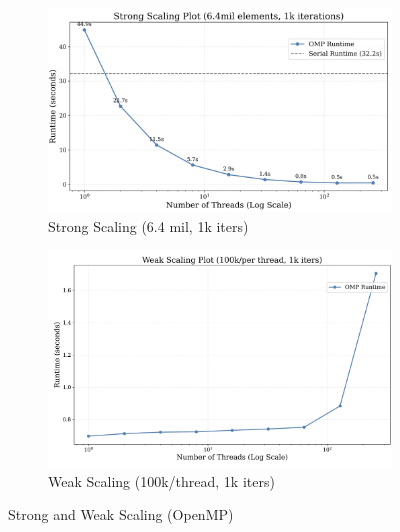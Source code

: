 \documentclass[a4paper,10pt]{article}
\begin{document}
\begin{figure}
     \centering
     \begin{subfigure}[b]{0.45\textwidth}
         \centering
         \includegraphics[width=\textwidth]{../images/2_openmp/strong_scaling.png}
         \caption{Strong Scaling (6.4 mil, 1k iters)}
         \label{fig:2_omp_strong_scaling}
     \end{subfigure}
     \hfill
     \begin{subfigure}[b]{0.45\textwidth}
         \centering
         \includegraphics[width=\textwidth]{../images/2_openmp/weak_scaling.png}
         \caption{Weak Scaling (100k/thread, 1k iters)}
         \label{fig:2_omp_weak_scaling}
     \end{subfigure}
     \caption{Strong and Weak Scaling (OpenMP) }
     \label{fig:2_omp_strong_weak}
\end{figure}
\end{document}

